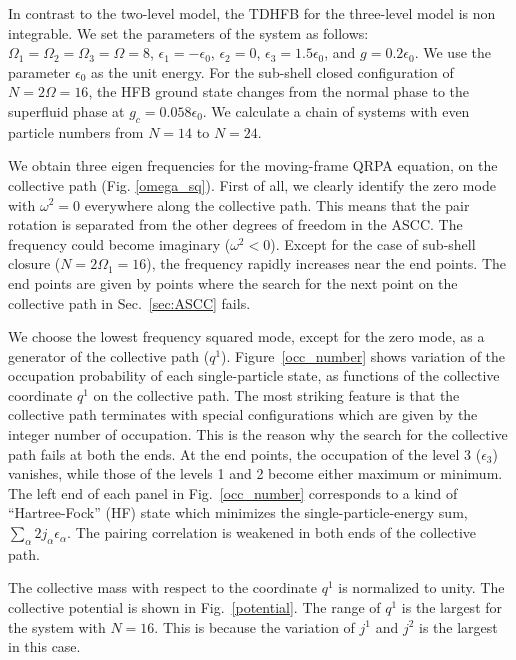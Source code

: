 \documentclass[11pt]{book} %
\begin{document}
In contrast to the two-level model,
the TDHFB for the three-level model is non integrable.
We set the parameters of the system as follows:
$\Omega_1=\Omega_2=\Omega_3=\Omega=8$,
$\epsilon_1=-\epsilon_0$, $\epsilon_2=0$, $\epsilon_3=1.5\epsilon_0$,
and $g=0.2\epsilon_0$.
We use the parameter $\epsilon_0$ as the unit energy.
For the sub-shell closed configuration of $N=2\Omega=16$,
the HFB ground state changes from the normal phase to
the superfluid phase at $g_c=0.058\epsilon_0$.
We calculate a chain of systems with even particle numbers
from $N=14$ to $N=24$. 

We obtain three eigen frequencies for the moving-frame QRPA equation, 
on the collective path (Fig. \ref{omega_sq}). 
First of all, we clearly identify the zero mode with $\omega^2=0$
everywhere along the collective path.
This means that the pair rotation is separated from the other
degrees of freedom in the ASCC.
The frequency could become imaginary ($\omega^2<0$).
Except for the case of sub-shell closure ($N=2\Omega_1=16$),
the frequency rapidly increases near the end points.
The end points are given by points where the search for the next point
on the collective path in Sec.~\ref{sec:ASCC} fails.

We choose the lowest frequency squared mode, except for the zero mode,
as a generator of the collective path ($q^1$).
Figure~\ref{occ_number} shows variation of the occupation probability
of each single-particle state, as functions of the collective
coordinate $q^1$ on the collective path.
The most striking feature is that the collective path terminates
with special configurations which are given by the integer number
of occupation.
This is the reason why the search for the collective path fails
at both the ends.
At the end points,
the occupation of the level 3 ($\epsilon_3$) vanishes, while
those of the levels 1 and 2 become either maximum or minimum.
The left end of each panel in Fig.~\ref{occ_number} corresponds to 
a kind of ``Hartree-Fock'' (HF) state which minimizes
the single-particle-energy sum, $\sum_\alpha 2j_\alpha \epsilon_\alpha$.
The pairing correlation is weakened in both ends of the
collective path.

The collective mass with respect to the coordinate $q^1$ is normalized
to unity.
The collective potential is shown in Fig.~\ref{potential}.
The range of $q^1$ is the largest for the system with $N=16$.
This is because the variation of $j^1$ and $j^2$ is the largest in
this case.
\end{document}
